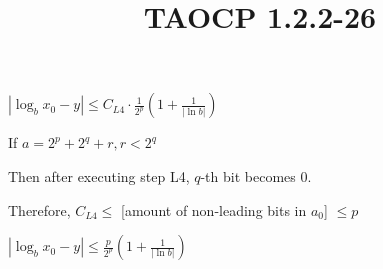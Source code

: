 \documentclass{article}
\title{TAOCP 1.2.2\mbox{-}26}
\begin{document}
\maketitle

\( |\log_b{x_{0}} - y| \leq C_{L4} \cdot \frac{1}{2^{p}}(1 + \frac{1}{|\ln b|}) \)

If \( a = 2^{p} + 2^{q} + r, r < 2^{q} \)

Then after executing step L4, \( q \)-th bit becomes 0.

Therefore, \( C_{L4} \leq \) [amount of non-leading bits in \( a_{0} \)] \( \leq p \)

\( |\log_b{x_{0}} - y| \leq \frac{p}{2^{p}}(1 + \frac{1}{|\ln b|}) \)
\end{document}
